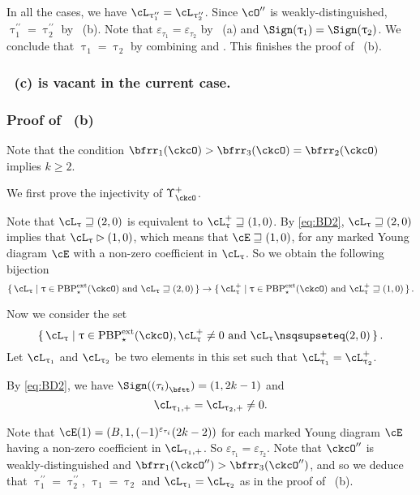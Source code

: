 \documentclass[12pt,a4paper]{amsart}
\numberwithin{equation}{section}
\theoremstyle{remark}
\def\PBPes{\mathrm{PBP}^{\mathrm{ext}}_{\star}}
\def\uptaupp{\uptau^{\prime\prime}}
\begin{document}
In all the cases, we have $\ac_{\uptaupp_1} = \ac_{\uptaupp_2}$.
Since $\cO''$ is weakly-distinguished,   $\uptaupp_{1}=\uptaupp_{2}$ by
~(b). Note that $\varepsilon_{\tau_1}=\varepsilon_{\tau_2}$ by
~(a) and $\Sign(\uptau_{1})=\Sign(\uptau_{2})$. We conclude that
$\uptau_{1}=\uptau_{2}$ by combining  and .
This finishes the proof of ~(b).

\subsubsection*{~(c) is vacant in the current case.}


\subsubsection*{Proof of ~(b)}

Note that the condition $\bfrr_{1}(\ckcO)>\bfrr_{3}(\ckcO)=\bfrr_{2}(\ckcO)$
implies $k\geq 2$.

\medskip

We first prove the injectivity of $\Upsilon^{+}_{\ckcO}$.

Note that
  $\ac_{\uptau}\sqsupseteq (2,0)$ is equivalent to $\pac{\uptau}\sqsupseteq
  (1,0)$. By \eqref{eq:BD2},  $\ac_{\uptau}\sqsupseteq (2,0)$ implies that $\ac_{\uptau}\rhd (1,0)$, which means 
  that $\cE \sqsupseteq (1,0)$, for any marked Young diagram $\cE$ with a non-zero coefficient in $\ac_{\uptau}$. So we obtain the following  bijection
  \[
    \set{\ac_{\uptau}|\uptau\in \PBPes(\ckcO) \text{ and }\ac_{\uptau}\sqsupseteq (2,0)} \rightarrow
     \set{\pac{\uptau}|\uptau\in \PBPes(\ckcO) \text{ and }\pac{\uptau}\sqsupseteq (1,0)}.
  \]

  Now we consider the set
  \[
   \set{\ac_{\uptau}|\uptau\in \PBPes(\ckcO),
  \pac{\uptau}\neq 0 \text{ and } \ac_{\uptau}\nsqsupseteq (2,0)}.
  \]
   Let $\ac_{\uptau_{1}}$
  and $\ac_{\uptau_{2}}$ be two elements in this set such that
  $\pac{\uptau_{1}}=\pac{\uptau_{2}}$.

  By \eqref{eq:BD2}, we have $\Sign(\ttail{(\tau_{i})}) = (1,2k-1)$ and
  \begin{equation}\label{eq:ft1}
  \ppac{\uptau_1} = \ppac{\uptau_2}\neq 0.
  \end{equation}

    Note that $\cE(1) = (B,1, (-1)^{\varepsilon_{\tau_{i}}}(2k-2))$ for each  marked Young diagram $\cE$ having a non-zero
    coefficient in $\ppac{\uptau_1}$. So $\varepsilon_{\tau_{1}}=\varepsilon_{\tau_{2}}$.
    Note that $\ckcO''$ is weakly-distinguished and $\bfrr_{1}(\ckcO'')>\bfrr_{3}(\ckcO'')$, and so we deduce that
    $\uptaupp_1 = \uptaupp_2$, $\uptau_1 =\uptau_2$ and $\ac_{\uptau_1} = \ac_{\uptau_2}$ as in the proof of ~(b).
\end{document}
